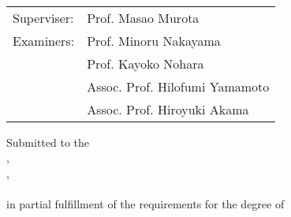 
\begin{titlepage}

\begin{addmargin}[-1cm]{-3cm}
\begin{center}
\large

\hfill
\vfill

\begingroup
\spacedallcaps{\myTitle} \\ \bigskip %
\endgroup

\myName

\vfill


\vfill

\begingroup
\begin{tabular}[!ht]{ll}
Superviser: & Prof. Masao Murota\\
Examiners: & Prof. Minoru Nakayama\\
& Prof. Kayoko Nohara\\
& Assoc. Prof. Hilofumi Yamamoto\\
& Assoc. Prof. Hiroyuki Akama\\
\end{tabular}
\endgroup

\vfill


Submitted to the \\
\bigskip
\myDepartment, \\
\myFaculty, \\
\myUni \\
\bigskip
in partial fulfillment of the requirements for the degree of\\
\bigskip
\myDegree

\bigskip

\myTime\ %

\vfill

\end{center}
\end{addmargin}

\end{titlepage}
